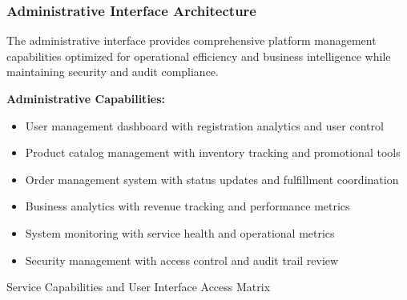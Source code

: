 \subsubsection{Administrative Interface Architecture}

The administrative interface provides comprehensive platform management capabilities optimized for operational efficiency and business intelligence while maintaining security and audit compliance.

\textbf{Administrative Capabilities:}
\begin{itemize}
\item User management dashboard with registration analytics and user control
\item Product catalog management with inventory tracking and promotional tools
\item Order management system with status updates and fulfillment coordination
\item Business analytics with revenue tracking and performance metrics
\item System monitoring with service health and operational metrics
\item Security management with access control and audit trail review
\end{itemize}

\begin{table}[H]
\centering
\caption{Service Capabilities and User Interface Access Matrix}
\label{tab:service-capabilities-matrix}
\end{table}


